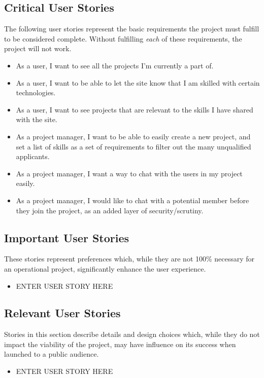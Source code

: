 \documentclass[a4paper, 12pt]{article}
\begin{document}
	\subsection{Critical User Stories}
		The following user stories represent the basic requirements the project must fulfill to be considered complete. Without fulfilling \textit{each} of these requirements, the project will not work.
		\begin{itemize}
			\item As a user, I want to see all the projects I'm currently a part of.
			\item As a user, I want to be able to let the site know that I am skilled with certain technologies.
			\item As a user, I want to see projects that are relevant to the skills I have shared with the site.
			\item As a project manager, I want to be able to easily create a new project, and set a list of skills as a set of requirements to filter out the many unqualified applicants.
			\item As a project manager, I want a way to chat with the users in my project easily.
			\item As a project manager, I would like to chat with a potential member before they join the project, as an added layer of security/scrutiny.
		\end{itemize}
		
	\subsection{Important User Stories}
		These stories represent preferences which, while they are not 100\% necessary for an operational project, significantly enhance the user experience.
		\begin{itemize}
			\item ENTER USER STORY HERE
		\end{itemize}
	
	\subsection{Relevant User Stories}
		Stories in this section describe details and design choices which, while they do not impact the viability of the project, may have influence on its success when launched to a public audience.
		\begin{itemize}
			\item ENTER USER STORY HERE
		\end{itemize}
\end{document}
